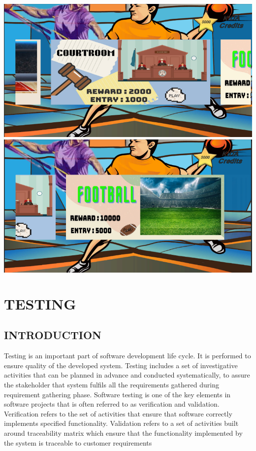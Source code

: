\documentclass[12pt]{report}
\begin{document}
\begin{center}
\includegraphics[scale=0.7]{image28.png}
\includegraphics[scale=0.7]{image29.png}
\end{center}



\vspace{1cm}

\clearpage
\centering
\section{TESTING}
\justifying
\setlength{\parindent}{4em}
\setlength{\parskip}{0.5em}
\renewcommand{\baselinestretch}{1.5}
\normalsize
\subsection{INTRODUCTION}
\hspace{1.7 cm}Testing is an important part of software development life cycle. It is performed to ensure 
quality of the developed system. Testing includes a set of investigative activities that can be 
planned in advance and conducted systematically, to assure the stakeholder that system 
fulfils all the requirements gathered during requirement gathering phase. Software testing is 
one of the key elements in software projects that is often referred to as verification and 
validation. Verification refers to the set of activities that ensure that software correctly 
implements specified functionality. Validation refers to a set of activities built around 
traceability matrix which ensure that the functionality implemented by the system is 
traceable to customer requirements
\end{document}
